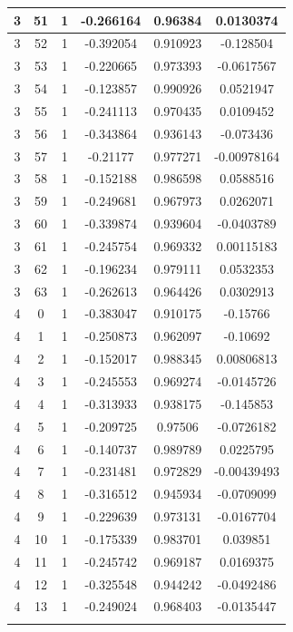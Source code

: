 \documentclass[12pt,a4paper]{article}
\numberwithin{equation}{section}
\numberwithin{figure}{section}
\numberwithin{table}{section}
\begin{document}
\begin{longtable}{|c|c|c|c|c|c|}
3 & 51 & 1 & -0.266164 & 0.96384 & 0.0130374 \\ \hline
3 & 52 & 1 & -0.392054 & 0.910923 & -0.128504 \\ \hline
3 & 53 & 1 & -0.220665 & 0.973393 & -0.0617567 \\ \hline
3 & 54 & 1 & -0.123857 & 0.990926 & 0.0521947 \\ \hline
3 & 55 & 1 & -0.241113 & 0.970435 & 0.0109452 \\ \hline
3 & 56 & 1 & -0.343864 & 0.936143 & -0.073436 \\ \hline
3 & 57 & 1 & -0.21177 & 0.977271 & -0.00978164 \\ \hline
3 & 58 & 1 & -0.152188 & 0.986598 & 0.0588516 \\ \hline
3 & 59 & 1 & -0.249681 & 0.967973 & 0.0262071 \\ \hline
3 & 60 & 1 & -0.339874 & 0.939604 & -0.0403789 \\ \hline
3 & 61 & 1 & -0.245754 & 0.969332 & 0.00115183 \\ \hline
3 & 62 & 1 & -0.196234 & 0.979111 & 0.0532353 \\ \hline
3 & 63 & 1 & -0.262613 & 0.964426 & 0.0302913 \\ \hline
4 & 0 & 1 & -0.383047 & 0.910175 & -0.15766 \\ \hline
4 & 1 & 1 & -0.250873 & 0.962097 & -0.10692 \\ \hline
4 & 2 & 1 & -0.152017 & 0.988345 & 0.00806813 \\ \hline
4 & 3 & 1 & -0.245553 & 0.969274 & -0.0145726 \\ \hline
4 & 4 & 1 & -0.313933 & 0.938175 & -0.145853 \\ \hline
4 & 5 & 1 & -0.209725 & 0.97506 & -0.0726182 \\ \hline
4 & 6 & 1 & -0.140737 & 0.989789 & 0.0225795 \\ \hline
4 & 7 & 1 & -0.231481 & 0.972829 & -0.00439493 \\ \hline
4 & 8 & 1 & -0.316512 & 0.945934 & -0.0709099 \\ \hline
4 & 9 & 1 & -0.229639 & 0.973131 & -0.0167704 \\ \hline
4 & 10 & 1 & -0.175339 & 0.983701 & 0.039851 \\ \hline
4 & 11 & 1 & -0.245742 & 0.969187 & 0.0169375 \\ \hline
4 & 12 & 1 & -0.325548 & 0.944242 & -0.0492486 \\ \hline
4 & 13 & 1 & -0.249024 & 0.968403 & -0.0135447 \\ \hline
\pagebreak

\end{longtable}
\end{document}
